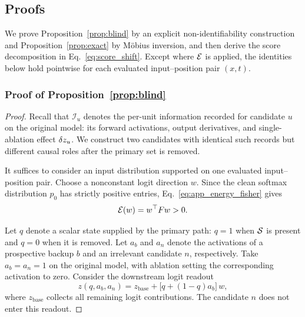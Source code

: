 \subsection{Proofs}\label{app:proofs}
We prove Proposition~\ref{prop:blind} by an explicit non-identifiability
construction and Proposition~\ref{prop:exact} by M\"obius inversion, and then
derive the score decomposition in Eq.~\ref{eq:score_shift}.
Except where $\mathcal{E}$ is applied, the identities below hold
pointwise for each evaluated input--position pair $(x,t)$.

\subsubsection{Proof of Proposition~\ref{prop:blind}}

\begin{proof}
Recall that $\mathcal{I}_u$ denotes the per-unit information recorded for
candidate $u$ on the original model: its forward activations, output derivatives,
and single-ablation effect $\delta z_u$.
We construct two candidates with identical such records but different causal
roles after the primary set is removed.

It suffices to consider an input distribution supported on one evaluated
input--position pair.
Choose a nonconstant logit direction $w$.
Since the clean softmax distribution $p_0$ has strictly positive entries,
Eq.~\ref{eq:app_energy_fisher} gives
\begin{equation}
\mathcal{E}(w)=w^\top Fw>0 .
\label{eq:app_blind_positive}
\end{equation}

Let $q$ denote a scalar state supplied by the primary path: $q=1$ when
$\mathcal{S}$ is present and $q=0$ when it is removed.
Let $a_b$ and $a_n$ denote the activations of a prospective backup $b$ and an
irrelevant candidate $n$, respectively.
Take $a_b=a_n=1$ on the original model, with ablation setting the corresponding
activation to zero.
Consider the downstream logit readout
\begin{equation}
z(q,a_b,a_n)
=
z_{\mathrm{base}}
+
\bigl[q+(1-q)a_b\bigr]\,w ,
\label{eq:app_blind_readout}
\end{equation}
where $z_{\mathrm{base}}$ collects all remaining logit contributions.
The candidate $n$ does not enter this readout.


\end{proof}
